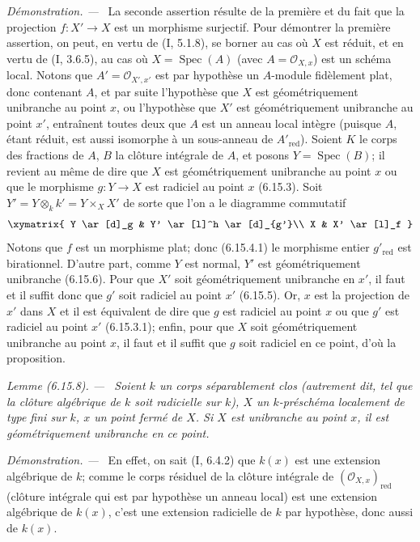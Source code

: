 \documentclass[10pt,oneside]{book}
\newcommand{\oldpage}[2][]{%
  \setcounter{footnote}{0}%
  \marginpar{\scriptsize\textbf{#1}~|~#2}\ignorespaces}
\newenvironment{lemma}[1][]{%
  \par\medskip\noindent\itshape Lemme (#1). ---\ }{\par}
\newenvironment{proof}{%
  \par\medskip\noindent\textit{Démonstration. ---\ }}{\par}
\begin{document}
\begin{proof}
La seconde assertion résulte de la première et du fait que la projection
$f:X'\to X$ est un morphisme surjectif. Pour démontrer la première
assertion, on peut, en vertu de (I, 5.1.8), se borner au cas où $X$ est
réduit, et en vertu de (I, 3.6.5), au cas
\oldpage[IV-2]{180}
où $X=\operatorname{Spec}(A)$ (avec $A=\mathcal O_{X,x}$) est un schéma local.
Notons que $A'=\mathcal O_{X',x'}$ est par hypothèse un $A$-module
fidèlement plat, donc contenant $A$, et par suite l'hypothèse que $X$ est
géométriquement unibranche au point $x$, ou l'hypothèse que $X'$ est
géométriquement unibranche au point $x'$, entraînent toutes deux que $A$
est un anneau local intègre (puisque $A$, étant réduit, est aussi isomorphe
à un sous-anneau de $A'_{\mathrm{red}}$). Soient $K$ le corps des fractions
de $A$, $B$ la clôture intégrale de $A$, et posons
$Y=\operatorname{Spec}(B)$; il revient au même de dire que $X$ est
géométriquement unibranche au point $x$ ou que le morphisme $g:Y\to X$
est radiciel au point $x$ (6.15.3). Soit
$Y'=Y\otimes_k k'=Y\times_X X'$ de sorte que l'on a le diagramme
commutatif
\[
\xymatrix{
Y \ar[d]_g & Y' \ar[l]^h \ar[d]_{g'}\\
X & X' \ar[l]_f
}
\]
Notons que $f$ est un morphisme plat; donc (6.15.4.1) le morphisme entier
$g'_{\mathrm{red}}$ est birationnel. D'autre part, comme $Y$ est normal,
$Y'$ est géométriquement unibranche (6.15.6). Pour que $X'$ soit
géométriquement unibranche en $x'$, il faut et il suffit donc que $g'$
soit radiciel au point $x'$ (6.15.5). Or, $x$ est la projection de $x'$ dans
$X$ et il est équivalent de dire que $g$ est radiciel au point $x$ ou que
$g'$ est radiciel au point $x'$ (6.15.3.1); enfin, pour que $X$ soit
géométriquement unibranche au point $x$, il faut et il suffit que $g$ soit
radiciel en ce point, d'où la proposition.
\end{proof}

\begin{lemma}[6.15.8]
\label{IV.2.s6.15.8-fr}
Soient $k$ un corps séparablement clos (autrement dit, tel que la clôture
algébrique de $k$ soit radicielle sur $k$), $X$ un $k$-préschéma localement
de type fini sur $k$, $x$ un point fermé de $X$. Si $X$ est unibranche au
point $x$, il est géométriquement unibranche en ce point.
\end{lemma}

\begin{proof}
En effet, on sait (I, 6.4.2) que $k(x)$ est une extension algébrique de
$k$; comme le corps résiduel de la clôture intégrale de
$(\mathcal O_{X,x})_{\mathrm{red}}$ (clôture intégrale qui est par
hypothèse un anneau local) est une extension algébrique de $k(x)$, c'est
une extension radicielle de $k$ par hypothèse, donc aussi de $k(x)$.
\end{proof}
\end{document}
